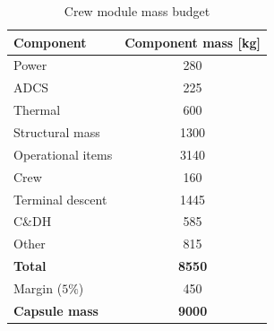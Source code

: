 \begin{table}[h]
\centering
\caption{Crew module mass budget}
\label{tab:crewmass}
\begin{tabular}{|l|c|}
\hline
{\bf Component}    & {\bf Component mass {[}kg{]}} \\ \hline \hline
Power              & 280                           \\ \hline
 ADCS        &  225                     \\ \hline
Thermal            & 600                           \\ \hline
Structural mass    & 1300                          \\ \hline
Operational items  & 3140                          \\ \hline
Crew               & 160                           \\ \hline
Terminal descent   & 1445                          \\ \hline
C\&DH              & 585                           \\ \hline 
Other    & 815                          \\ \hline \hline
\textbf{Total}    & \textbf{8550}                          \\ \hline \hline
Margin ($5\%$)  & 450                        \\ \hline \hline
{\bf Capsule mass} & {\bf 9000}                    \\ \hline
\end{tabular}
\end{table}